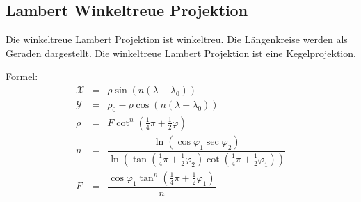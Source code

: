 \subsection{Lambert Winkeltreue Projektion}
\label{sec:lamwink}
Die winkeltreue Lambert Projektion ist winkeltreu. Die Längenkreise werden als Geraden dargestellt.
Die winkeltreue Lambert Projektion ist eine Kegelprojektion. 

Formel:\\
 \begin{eqnarray*}
 \mathcal{X}& = &\rho \sin ( n(\lambda -\lambda _0) )\\
 \mathcal{Y}& = &\rho _0-\rho \cos (n(\lambda - \lambda _0))\\
 \rho & = &F\cot ^n(\frac{1}{4}\pi + \frac{1}{2}\varphi)\\
 n& = &\dfrac{\ln (\cos \varphi _1 \sec \varphi _2)}{\ln (\tan (\frac{1}{4}\pi +\frac{1}{2}\varphi _2)\cot (\frac{1}{4}\pi + \frac{1}{2}\varphi _1))}\\
 F& = &\dfrac{\cos \varphi _1 \tan ^n(\frac{1}{4}\pi +\frac{1}{2}\varphi _1)}{n}
 \end{eqnarray*}